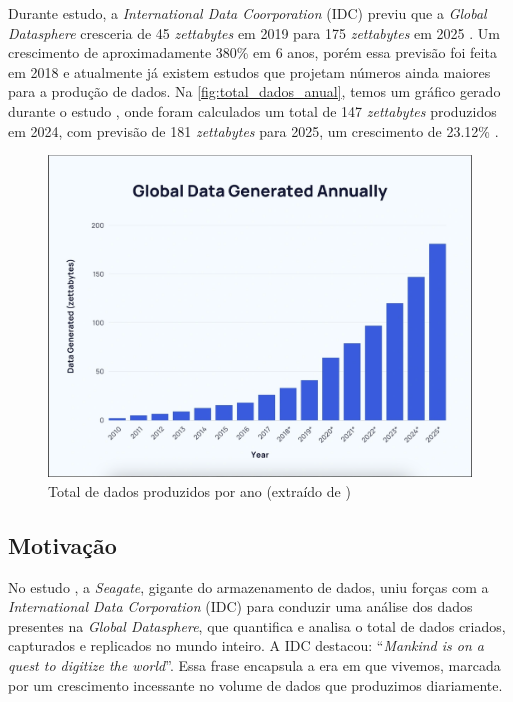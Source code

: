 \documentclass[a4paper, 12pt]{article}
\newcommand{\citeb}[1]{\bibleftbracket\cite{#1}\bibrightbracket}
\begin{document}
    Durante estudo, a \textit{International Data Coorporation} (IDC) previu que a \textit{Global Datasphere} cresceria de 45 \textit{zettabytes} em 2019 para 175 \textit{zettabytes} em 2025 \citeb{digitization}. Um crescimento de aproximadamente 380\% em 6 anos, porém essa previsão foi feita em 2018 e atualmente já existem estudos que projetam números ainda maiores para a produção de dados. Na \autoref{fig:total_dados_anual}, temos um gráfico gerado durante o estudo , onde foram calculados um total de 147 \textit{zettabytes} produzidos em 2024, com previsão de 181 \textit{zettabytes} para 2025, um crescimento de 23.12\% \citeb{data_created}.

    \begin{figure}[ht]
        \includegraphics[width=\textwidth,height=0.9\textheight,keepaspectratio]{global-data-generated-annually-fabio-duarte.png}
        \centering
        \caption{Total de dados produzidos por ano (extraído de \citeb{data_created})}
        \centering
        \label{fig:total_dados_anual}
    \end{figure}        

    \subsection{Motivação}

    No estudo , a \textit{Seagate}, gigante do armazenamento de dados, uniu forças com a \textit{International Data Corporation} (IDC) para conduzir uma análise dos dados presentes na \textit{Global Datasphere}, que quantifica e analisa o total de dados criados, capturados e replicados no mundo inteiro. A IDC destacou: ``\textit{Mankind is on a quest to digitize the world}''. Essa frase encapsula a era em que vivemos, marcada por um crescimento incessante no volume de dados que produzimos diariamente.
    
\end{document}
